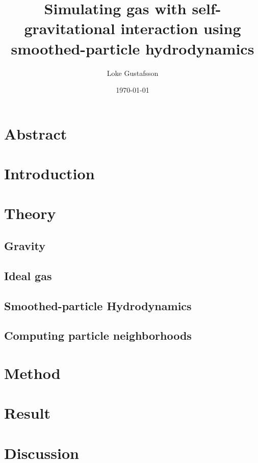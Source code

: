 \documentclass{report}
\title{Simulating gas with self-gravitational interaction using smoothed-particle hydrodynamics}
\subtitle{}
\author{Loke Gustafsson}
\date{\today}
\begin{document}


\chapter*{Abstract}
    

\tableofcontents

\chapter{Introduction}
    

\chapter{Theory}
    \section{Gravity}
    

    \section{Ideal gas}
    

    \section{Smoothed-particle Hydrodynamics}
    

    \section{Computing particle neighborhoods}
    

\chapter{Method}
    

\chapter{Result}
    

\chapter{Discussion}
    

\printbibliography[heading=bibintoc,title={References}]
\end{document}
